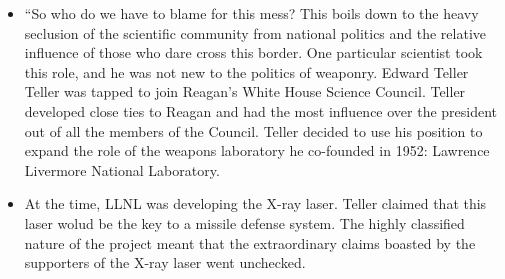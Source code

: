 \documentclass[12pt]{article}
\begin{document}
\begin{description}
\begin{itemize}
      \item ``So who do we have to blame for this mess? This boils down to the
        heavy seclusion of the scientific community from national politics and
        the relative influence of those who dare cross this border. One
        particular scientist took this role, and he was not new to the politics
        of weaponry. Edward Teller  %
        Teller was tapped to join Reagan's White House Science Council. Teller
        developed close ties to Reagan and had the most influence over the
        president out of all the members of the Council. Teller decided to use
        his position to expand the role of the weapons laboratory he co-founded
        in 1952: Lawrence Livermore National Laboratory.

      \item At the time, LLNL was developing the X-ray laser. Teller claimed
        that this laser wolud be the key to a missile defense system. %
        The highly classified nature of the project meant that the
        extraordinary claims boasted by the supporters of the X-ray laser went
        unchecked. %
    \end{itemize}

\end{description}
\end{document}
